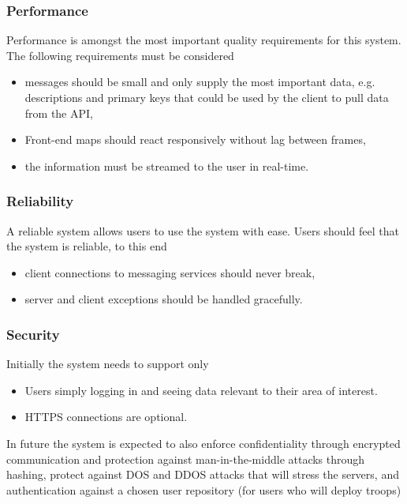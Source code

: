 \subsubsection{Performance}
Performance is amongst the most important quality requirements for this system. The following requirements must be considered
\begin{itemize}
\item messages should be small and only supply the most important data, e.g. descriptions and primary keys that could be used by the client to pull data from the API,
\item Front-end maps should react responsively without lag between frames, 
\item the information must be streamed to the user in real-time.
\end{itemize}

\subsubsection{Reliability}
A reliable system allows users to use the system with ease. Users should feel that the system is reliable, to this end
\begin{itemize}
\item client connections to messaging services should never break,
\item server and client exceptions should be handled gracefully.
\end{itemize}

\subsubsection{Security}
Initially the system needs to support only
\begin{itemize}
	\item Users simply logging in and seeing data relevant to their area of interest. 
	\item HTTPS connections are optional.	
\end{itemize}
In future the system is expected to also enforce confidentiality through encrypted communication and protection against man-in-the-middle attacks through hashing, protect against DOS and DDOS attacks that will stress the servers, and authentication against a chosen user repository (for users who will deploy troops) 


